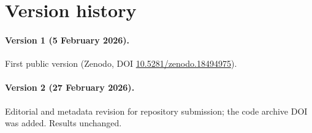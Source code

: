 \section{Version history}
\label{app:versions}

\paragraph{Version 1 (5 February 2026).}
First public version (Zenodo, DOI \href{https://doi.org/10.5281/zenodo.18494975}{10.5281/zenodo.18494975}).

\paragraph{Version 2 (27 February 2026).}
Editorial and metadata revision for repository submission; the code archive DOI was added. Results unchanged.

